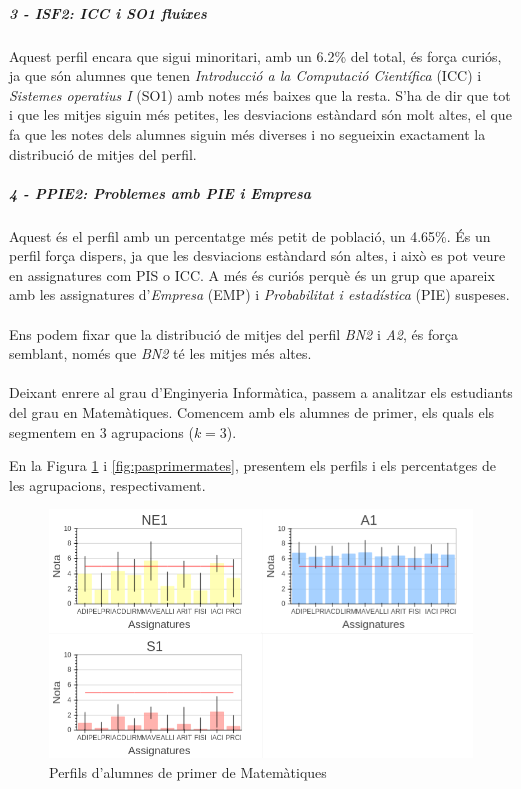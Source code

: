 \documentclass[12pt,a4paper,catalan]{article}
\begin{document}
\subparagraph{3 - ISF2: ICC i SO1 fluixes}
Aquest perfil encara que sigui minoritari, amb un 6.2\% del total, és força curiós, ja que són alumnes que tenen \textit{Introducció a la Computació Científica} (ICC) i \textit{Sistemes operatius I} (SO1) amb notes més baixes que la resta. S'ha de dir que tot i que les mitjes siguin més petites, les desviacions estàndard són molt altes, el que fa que les notes dels alumnes siguin més diverses i no segueixin exactament la distribució de mitjes del perfil.

\subparagraph{4 - PPIE2: Problemes amb PIE i Empresa}
Aquest és el perfil amb un percentatge més petit de població, un 4.65\%. És un perfil força dispers, ja que les desviacions estàndard són altes, i això es pot veure en assignatures com PIS o ICC. A més és curiós perquè és un grup que apareix amb les assignatures d'\textit{Empresa} (EMP) i \textit{Probabilitat i estadística} (PIE) suspeses.
\\
\\
Ens podem fixar que la distribució de mitjes del perfil \textit{BN2} i \textit{A2}, és força semblant, només que \textit{BN2} té les mitjes més altes.
\\
\\
Deixant enrere al grau d'Enginyeria Informàtica, passem a analitzar els estudiants del grau en Matemàtiques. Comencem amb els alumnes de primer, els quals els segmentem en 3 agrupacions ($k=3$).

\newpage

En la Figura \ref{fig:perfilsprimermates} i \ref{fig:pasprimermates}, presentem els perfils i els percentatges de les agrupacions, respectivament.

\begin{figure}[h]
\centering
\includegraphics[width=.9\linewidth]{img/perfils_primer_mates.png}
\caption{Perfils d'alumnes de primer de Matemàtiques}
\label{fig:perfilsprimermates}
\end{figure}
\end{document}
